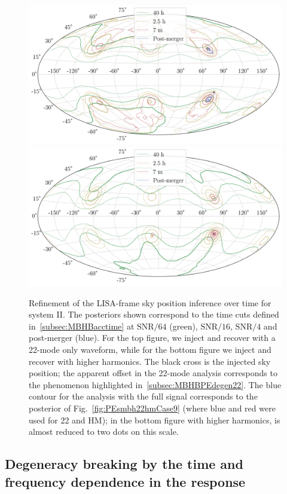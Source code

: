 \documentclass[aps,showpacs,twocolumn,prd,superscriptaddress,nofootinbib]{revtex4-1}
\begin{document}
\begin{figure}
  \centering
  \includegraphics[width=.8\linewidth]{skymap_Lframe_tseries_bambi_22.png}
  \includegraphics[width=.8\linewidth]{skymap_Lframe_tseries_ptmcmc_hm.png}
  \caption{Refinement of the LISA-frame sky position inference over time for system II. The posteriors shown correspond to the time cuts defined in~\ref{subsec:MBHBacctime} at $\mathrm{SNR}/64$ (green), $\mathrm{SNR}/16$, $\mathrm{SNR}/4$ and post-merger (blue). For the top figure, we inject and recover with a 22-mode only waveform, while for the bottom figure we inject and recover with higher harmonics. The black cross is the injected sky position; the apparent offset in the 22-mode analysis corresponds to the phenomenon highlighted in~\ref{subsec:MBHBPEdegen22}. The blue contour for the analysis with the full signal corresponds to the posterior of Fig.~\ref{fig:PEsmbh22hmCase9} (where blue and red were used for 22 and HM); in the bottom figure with higher harmonics, is almost reduced to two dots on this scale.}
  \label{fig:MollweidesmbhTseriesCase922hm}
\end{figure}

\subsection{Degeneracy breaking by the time and frequency dependence in the response}
\label{subsec:MBHBacctimebreakdegen}
\end{document}
